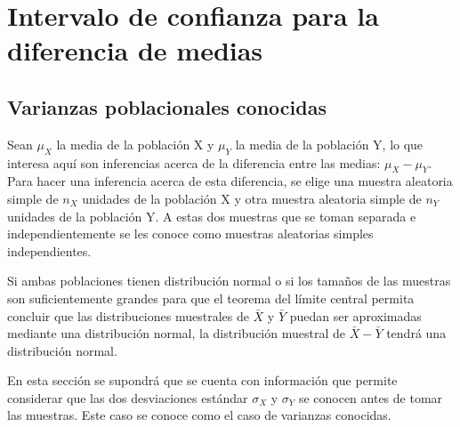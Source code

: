 \documentclass[
  11pt,
]{book}
\theoremstyle{definition}
\theoremstyle{definition}
\theoremstyle{definition}
\theoremstyle{definition}
\theoremstyle{remark}
\begin{document}
\section{Intervalo de confianza para la diferencia de medias}\label{intervalo-de-confianza-para-la-diferencia-de-medias}

\subsection{Varianzas poblacionales conocidas}\label{intervalo-de-confianza-para-la-diferencia-de-medias-varianzas-conocidas}

Sean \(\mu_X\) la media de la población X y \(\mu_Y\) la media de la población Y, lo que interesa aquí son inferencias acerca de la diferencia entre las medias: \(\mu_X - \mu_Y\). Para hacer una inferencia acerca de esta diferencia, se elige una muestra aleatoria simple de \(n_X\) unidades de la población X y otra muestra aleatoria simple de \(n_Y\) unidades de la población Y. A estas dos muestras que se toman separada e independientemente se les conoce como muestras aleatorias simples independientes.

Si ambas poblaciones tienen distribución normal o si los tamaños de las muestras son suficientemente grandes para que el teorema del límite central permita concluir
que las distribuciones muestrales de \(\bar{X}\) y \(\bar{Y}\) puedan ser aproximadas mediante una distribución normal, la distribución muestral de \(\bar{X} - \bar{Y}\) tendrá una distribución normal.

En esta sección se supondrá que se cuenta con información que permite considerar que las dos desviaciones estándar \(\sigma_X\) y \(\sigma_Y\) se conocen antes de tomar las muestras. Este caso se conoce como el caso de varianzas conocidas. \citep[página 396]{anderson}

\begin{table}[H]
\centering
\caption{\label{tab:unnamed-chunk-8}Intervalos de confianza para la diferencia de medias de dos distribucones normales y varianzas poblacionales conocidas}
\centering
{}
\end{table}
\end{document}
